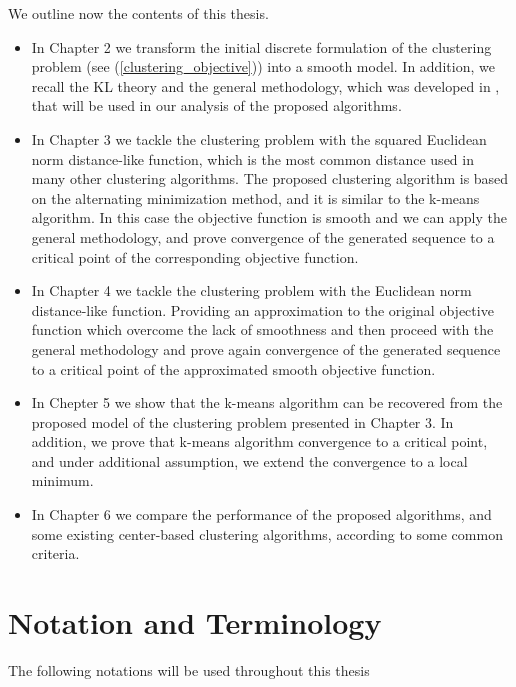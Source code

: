 We outline now the contents of this thesis.
\begin{itemize}
	\item In Chapter 2 we transform the initial discrete formulation  of the clustering problem (see (\ref{clustering_objective})) into a smooth model. In addition, we recall the KL theory and the general methodology, which was developed in \cite{BST2014}, that will be used in our analysis of the proposed algorithms.
	\item In Chapter 3 we tackle the clustering problem with the squared Euclidean norm distance-like function, which is the most common distance used in many other clustering algorithms. The proposed clustering algorithm is based on the alternating minimization method, and it is similar to the k-means algorithm. In this case the objective function is smooth and we can apply the general methodology, and prove convergence of the generated sequence to a critical point of the corresponding objective function.
	\item In Chapter 4 we tackle the clustering problem with the Euclidean norm distance-like function. Providing an approximation to the original objective function which overcome the lack of smoothness and then proceed with the general methodology and prove again convergence of the generated sequence to a critical point of the approximated smooth objective function.
	\item In Chepter 5 we show that the k-means algorithm can be recovered from the proposed model of the clustering problem presented in Chapter 3. In addition, we prove that k-means algorithm convergence to a critical point, and under additional assumption, we extend the convergence to a local minimum.
	\item In Chapter 6 we compare the performance of the proposed algorithms, and some existing center-based clustering algorithms, according to some common criteria.
\end{itemize}

\clearpage
\section{Notation and Terminology}

The following notations will be used throughout this thesis

